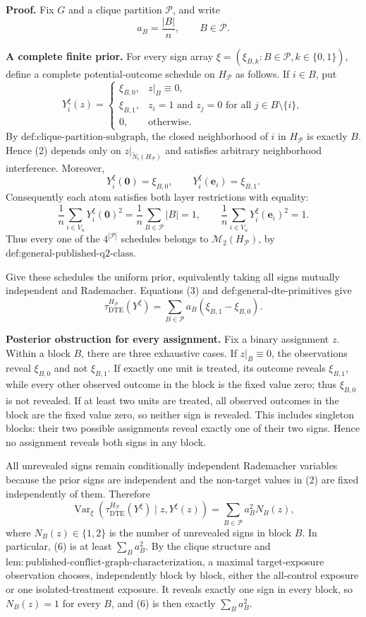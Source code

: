 \textbf{Proof.}
Fix \(G\) and a clique partition \(\mathcal P\), and write
\[
a_B=\frac{|B|}{n},\qquad B\in\mathcal P.
\tag{1}
\]

\textbf{A complete finite prior.}
For every sign array \(\xi=(\xi_{B,k}:B\in\mathcal P,k\in\{0,1\})\), define a complete potential-outcome schedule on \(H_{\mathcal P}\) as follows.  If \(i\in B\), put
\[
Y_i^{\xi}(z)=
\begin{cases}
\xi_{B,0},&z|_B\equiv0,\\
\xi_{B,1},&z_i=1\text{ and }z_j=0\text{ for all }j\in B\setminus\{i\},\\
0,&\text{otherwise}.
\end{cases}
\tag{2}
\]
By \(\text{def:clique-partition-subgraph}\), the closed neighborhood of \(i\) in \(H_{\mathcal P}\) is exactly \(B\).  Hence (2) depends only on \(z|_{\widetilde N_i(H_{\mathcal P})}\) and satisfies arbitrary neighborhood interference.  Moreover,
\[
Y_i^{\xi}(\mathbf 0)=\xi_{B,0},
\qquad
Y_i^{\xi}(\mathbf e_i)=\xi_{B,1}.
\tag{3}
\]
Consequently each atom satisfies both layer restrictions with equality:
\[
\frac1n\sum_{i\in V_n}Y_i^{\xi}(\mathbf0)^2
=\frac1n\sum_{B\in\mathcal P}|B|=1,
\qquad
\frac1n\sum_{i\in V_n}Y_i^{\xi}(\mathbf e_i)^2=1.
\tag{4}
\]
Thus every one of the \(4^{|\mathcal P|}\) schedules belongs to \(\mathcal M_2(H_{\mathcal P})\), by \(\text{def:general-published-q2-class}\).

Give these schedules the uniform prior, equivalently taking all signs mutually independent and Rademacher.  Equations (3) and \(\text{def:general-dte-primitives}\) give
\[
\tau_{\mathrm{DTE}}^{H_{\mathcal P}}(Y^{\xi})
=\sum_{B\in\mathcal P}a_B(\xi_{B,1}-\xi_{B,0}).
\tag{5}
\]

\textbf{Posterior obstruction for every assignment.}
Fix a binary assignment \(z\).  Within a block \(B\), there are three exhaustive cases.  If \(z|_B\equiv0\), the observations reveal \(\xi_{B,0}\) and not \(\xi_{B,1}\).  If exactly one unit is treated, its outcome reveals \(\xi_{B,1}\), while every other observed outcome in the block is the fixed value zero; thus \(\xi_{B,0}\) is not revealed.  If at least two units are treated, all observed outcomes in the block are the fixed value zero, so neither sign is revealed.  This includes singleton blocks: their two possible assignments reveal exactly one of their two signs.  Hence no assignment reveals both signs in any block.

All unrevealed signs remain conditionally independent Rademacher variables because the prior signs are independent and the non-target values in (2) are fixed independently of them.  Therefore
\[
\operatorname{Var}_{\xi}\!\left(
\tau_{\mathrm{DTE}}^{H_{\mathcal P}}(Y^{\xi})
\mid z,Y^{\xi}(z)
\right)
=\sum_{B\in\mathcal P}a_B^2N_B(z),
\tag{6}
\]
where \(N_B(z)\in\{1,2\}\) is the number of unrevealed signs in block \(B\).  In particular, (6) is at least \(\sum_Ba_B^2\).  By the clique structure and \(\mathrm{lem{:}published\text{-}conflict\text{-}graph\text{-}characterization}\), a maximal target-exposure observation chooses, independently block by block, either the all-control exposure or one isolated-treatment exposure.  It reveals exactly one sign in every block, so \(N_B(z)=1\) for every \(B\), and (6) is then exactly \(\sum_Ba_B^2\).

